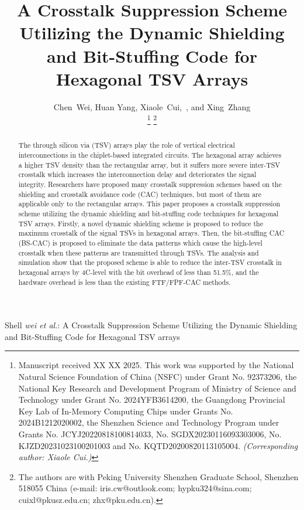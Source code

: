 \documentclass[lettersize,journal]{IEEEtran}
\begin{document}
\title{A Crosstalk Suppression Scheme Utilizing the Dynamic Shielding and Bit-Stuffing Code for Hexagonal TSV Arrays}

\author{Chen~Wei,
	Huan Yang, 
	Xiaole~Cui,~, 
	and Xing~Zhang
	
\thanks{Manuscript received XX XX 2025. This work was supported by the National Natural Science Foundation of China (NSFC) under Grant No. 92373206, the National Key Research and Development Program of Ministry of Science and Technology under Grant No. 2024YFB3614200, the Guangdong Provincial Key Lab of In-Memory Computing Chips	under Grants No. 2024B1212020002, the Shenzhen Science and Technology Program under Grants No. JCYJ20220818100814033, No. SGDX20230116093303006, No. KJZD20231023100201003 and No. KQTD20200820113105004. \textit{(Corresponding author: Xiaole Cui.)}}%
\thanks{The authors are with Peking University Shenzhen Graduate School, Shenzhen 518055 China (e-mail: iris.cw@outlook.com; hypku324@sina.com; cuixl@pkusz.edu.cn; zhx@pku.edu.cn).}%
}

%
{Shell \MakeLowercase{\textit{Wei et al.}}: A Crosstalk Suppression Scheme Utilizing the Dynamic Shielding and Bit-Stuffing Code for Hexagonal TSV arrays}


\maketitle

\begin{abstract}
The through silicon via (TSV) arrays play the role of vertical electrical interconnections in the chiplet-based integrated circuits. The hexagonal array achieves a higher TSV density than the rectangular array, but it suffers more severe inter-TSV crosstalk which increases the interconnection delay and deteriorates the signal integrity. Researchers have proposed many crosstalk suppression schemes based on the shielding and crosstalk avoidance code (CAC) techniques, but most of them are applicable only to the rectangular arrays. This paper proposes a crosstalk suppression scheme utilizing the dynamic shielding and bit-stuffing code techniques for hexagonal TSV arrays. Firstly, a novel dynamic shielding scheme is proposed to reduce the maximum crosstalk of the signal TSVs in hexagonal arrays. Then, the bit-stuffing CAC (BS-CAC) is proposed to eliminate the data patterns which cause the high-level crosstalk when these patterns are transmitted through TSVs. The analysis and simulation show that the proposed scheme is able to reduce the inter-TSV crosstalk in hexagonal arrays by 4C-level with the bit overhead of less than 51.5\%, and the hardware overhead is less than the existing FTF/FPF-CAC methods. 
 
\end{abstract}
\end{document}
